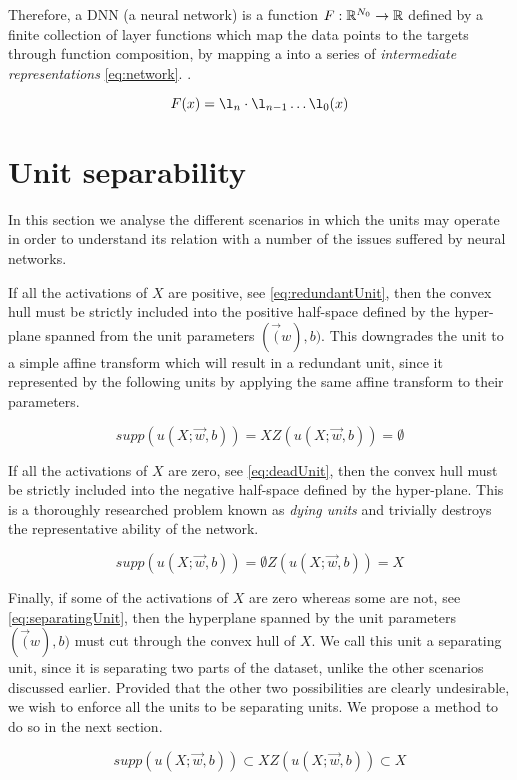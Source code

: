 Therefore, a DNN (a neural network) is a function $F:\mathbb{R}^{N_0}\rightarrow\mathbb{R}$ defined by a finite collection of layer functions which map the data points to the targets through function composition, by mapping a into a series of \emph{intermediate representations} \ref{eq:network}. \cite{ramachandranEtAl2017SearchingForActivationFunctions,eswaranSingh2015SomeTheoremsForFFNN}.

\begin{equation}\label{eq:network}
F(x) = \l_n \cdot \l_{n-1} \dots \l_0(x) 
\end{equation}

\section{Unit separability}

In this section we analyse the different scenarios in which the units may operate in order to understand its relation with a number of the issues suffered by neural networks.

If all the activations of $X$ are positive, see \ref{eq:redundantUnit}, then the convex hull must be strictly included into the positive half-space defined by the hyper-plane spanned from the unit parameters $(\vec(w), b)$. This downgrades the unit to a simple affine transform which will result in a redundant unit, since it represented by the following units by applying the same affine transform to their parameters.

\begin{equation}\label{eq:redundantUnit}
    supp(u(X;\vec{w},b))= X
    Z(u(X;\vec{w},b))= \emptyset
\end{equation}

If all the activations of $X$ are zero, see \ref{eq:deadUnit}, then the convex hull must be strictly included into the negative half-space defined by the hyper-plane. This is a thoroughly researched problem known as \emph{dying units} and trivially destroys the representative ability of the network.

\begin{equation}\label{eq:deadUnit}
    supp(u(X;\vec{w},b))= \emptyset
    Z(u(X;\vec{w},b))= X
\end{equation}

Finally, if some of the activations of $X$ are zero whereas some are not, see \ref{eq:separatingUnit}, then the hyperplane spanned by the unit parameters $(\vec(w), b)$ must cut through the convex hull of $X$. We call this unit a separating unit, since it is separating two parts of the dataset, unlike the other scenarios discussed earlier. Provided that the other two possibilities are clearly undesirable, we wish to enforce all the units to be separating units. We propose a method to do so in the next section.

\begin{equation}\label{eq:separatingUnit}
    supp(u(X;\vec{w},b)) \subset X
    Z(u(X;\vec{w},b))\subset X
\end{equation}
